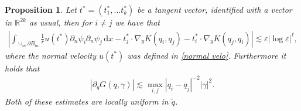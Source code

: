 \documentclass[JEP,XML,SOM,Unicode,published]{cedram}
\let\epsilon\varepsilon
\newtheorem{proposition}[theorem]{Proposition}
\theoremstyle{definition}
\newcommand\R{\mathbb{R}}
\newcommand\dd{\,\mathrm{d}}
\newcommand\dx{\dd x}
\let\de\partial
\let\eps\epsilon
\begin{document}
\begin{proposition}\label{crossterms G}
Let $t^*=(t_1^*,\dots t_k^*)$ be a tangent vector, identified with a vector in $\R^{2k}$ as usual, then for $i\neq j$ we have that
\begin{align*}
\left|\int_{\cup_m\de B_m}\frac{1}{r}u(t^*)\de_n\psi_i\de_n\psi_j\dx-t_j^*\cdot\nabla_yK(q_i,q_j)-t_i^*\cdot\nabla_yK(q_j,q_i)\right|\lesssim \eps|{\log\eps}|^\ell,
\end{align*}
where the normal velocity $u(t^*)$ was defined in \eqref{normal velo}. Furthermore it holds that
\begin{align*}
\left|\de_q G(q,\gamma)\right|\lesssim \max_{i,j}|q_i-q_j|^{-2}|\gamma|^2.
\end{align*}
Both of these estimates are locally uniform in $\tilde{q}$.

\end{proposition}
\end{document}

